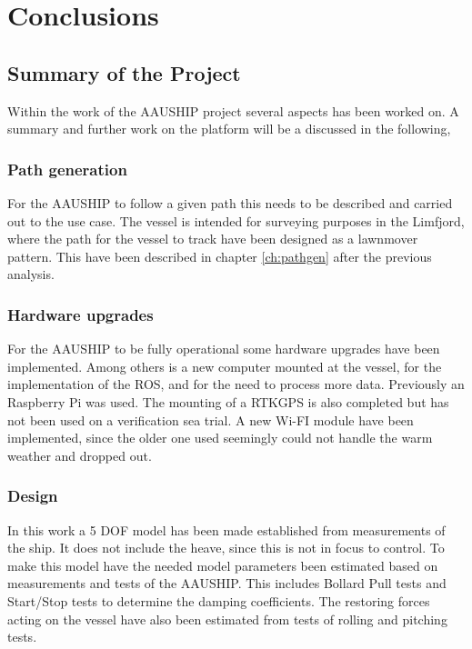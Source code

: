 \chapter{Conclusions}
\label{sc:FW}

\section{Summary of the Project}
Within the work of the AAUSHIP project several aspects has been worked on. A summary and further work on the platform will be a discussed in the following,

\subsection{Path generation}
For the AAUSHIP to follow a given path this needs to be described and carried out to the use case. The vessel is intended for surveying purposes in the Limfjord, where the path for the vessel to track have been designed as a lawnmover pattern. This have been described in chapter \ref{ch:pathgen} after the previous analysis.

\subsection{Hardware upgrades}
For the AAUSHIP to be fully operational some hardware upgrades have been implemented. Among others is a new computer mounted at the vessel, for the implementation of the \ac{ROS}, and for the need to process more data. Previously an Raspberry Pi was used. The mounting of a \ac{RTK}\ac{GPS} is also completed but has not been used on a verification sea trial. A new Wi-FI module have been implemented, since the older one used seemingly could not handle the warm weather and dropped out.

\subsection{Design}
In this work a 5 \ac{DOF} model has been made established from measurements of the ship. It does not include the heave, since this is not in focus to control. To make this model have the needed model parameters been estimated based on measurements and tests of the AAUSHIP. This includes Bollard Pull tests and Start/Stop tests to determine the damping coefficients. The restoring forces acting on the vessel have also been estimated from tests of rolling and pitching tests.


